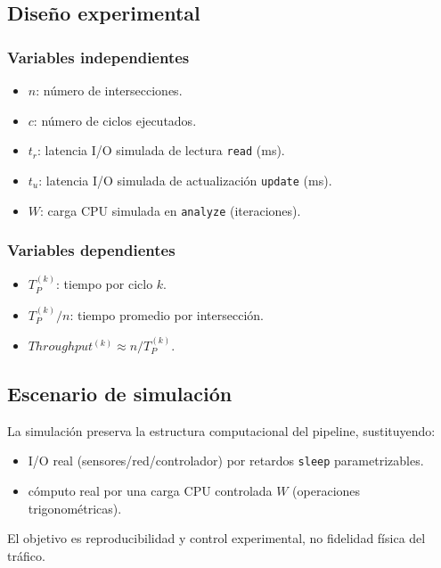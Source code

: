 \documentclass[12pt]{article}
\begin{document}
\subsection{Diseño experimental}

\subsubsection{Variables independientes}

\begin{itemize}
\item \(n\): número de intersecciones.
\item \(c\): número de ciclos ejecutados.
\item \(t_r\): latencia I/O simulada de lectura \texttt{read} (ms).
\item \(t_u\): latencia I/O simulada de actualización \texttt{update} (ms).
\item \(W\): carga CPU simulada en \texttt{analyze} (iteraciones).
\end{itemize}

\subsubsection{Variables dependientes}

\begin{itemize}
\item \(T_P^{(k)}\): tiempo por ciclo \(k\).
\item \(T_P^{(k)}/n\): tiempo promedio por intersección.
\item \(Throughput^{(k)} \approx n/T_P^{(k)}\).
\end{itemize}

\subsection{Escenario de simulación}

La simulación preserva la estructura computacional del pipeline, sustituyendo:

\begin{itemize}
\item I/O real (sensores/red/controlador) por retardos \texttt{sleep} parametrizables.
\item cómputo real por una carga CPU controlada \(W\) (operaciones trigonométricas).
\end{itemize}

El objetivo es reproducibilidad y control experimental, no fidelidad física del tráfico.
\end{document}
